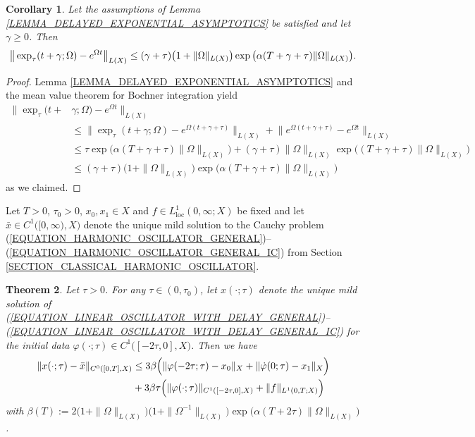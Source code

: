 \documentclass[12pt]{article}
\newtheorem{theorem}{Theorem}[section]
\newtheorem{corollary}[theorem]{Corollary}
\numberwithin{equation}{section}
\numberwithin{equation}{section}
\begin{document}
	\begin{corollary}
		\label{COROLLARY_DELAYED_EXPONENTIAL_ASYMPTOTICS}
		Let the assumptions of Lemma \ref{LEMMA_DELAYED_EXPONENTIAL_ASYMPTOTICS} be satisfied and let $\gamma \geq 0$. Then
		\begin{equation}
			\big\|\exp_{\tau}(t + \gamma; \Omega) - e^{\Omega t}\big\|_{L(X)}
			\leq (\gamma + \tau) \big(1 + \|\Omega\|_{L(X)}\big) \exp\big(\alpha (T + \gamma + \tau) \|\Omega\|_{L(X)}\big). \notag
		\end{equation}
	\end{corollary}

	\begin{proof}
		Lemma \ref{LEMMA_DELAYED_EXPONENTIAL_ASYMPTOTICS} and the mean value theorem for Bochner integration yield
		\begin{align*}
			\big\|\exp_{\tau}(t + &\gamma; \Omega) - e^{\Omega t}\big\|_{L(X)} \\
			&\leq \big\|\exp_{\tau}(t + \gamma; \Omega) - e^{\Omega (t + \gamma + \tau)}\big\|_{L(X)} +
			\big\|e^{\Omega (t + \gamma + \tau)} - e^{\Omega t}\big\|_{L(X)} \\
			&\leq \tau \exp\big(\alpha (T + \gamma + \tau) \|\Omega\|_{L(X)}\big) + 
			(\gamma + \tau) \|\Omega\|_{L(X)} \exp\big((T + \gamma + \tau) \|\Omega\|_{L(X)}\big) \\
			&\leq (\gamma + \tau) \big(1 + \|\Omega\|_{L(X)}\big) \exp\big(\alpha (T + \gamma + \tau) \|\Omega\|_{L(X)}\big)
		\end{align*}
		as we claimed.
	\end{proof}

	Let $T > 0$, $\tau_{0} > 0$, $x_{0}, x_{1} \in X$ and $f \in L^{1}_{\mathrm{loc}}(0, \infty; X)$ be fixed and
	let $\bar{x} \in C^{1}\big([0, \infty), X\big)$ denote the unique mild solution to the Cauchy problem 
	(\ref{EQUATION_HARMONIC_OSCILLATOR_GENERAL})--(\ref{EQUATION_HARMONIC_OSCILLATOR_GENERAL_IC})
	from Section \ref{SECTION_CLASSICAL_HARMONIC_OSCILLATOR}.
	\begin{theorem}
		\label{THEOREM_DELAYED_EQUATION_ASYMPTOTICS}
		Let $\tau > 0$.	For any $\tau \in (0, \tau_{0})$, let $x(\cdot; \tau)$ denote the unique mild solution of
		(\ref{EQUATION_LINEAR_OSCILLATOR_WITH_DELAY_GENERAL})--(\ref{EQUATION_LINEAR_OSCILLATOR_WITH_DELAY_GENERAL_IC})
		for the initial data $\varphi(\cdot; \tau) \in C^{1}\big([-2\tau, 0], X\big)$.
		Then we have
		\begin{equation}
			\begin{split}
				\|x(\cdot; \tau) - \bar{x}\|_{C^{0}([0, T], X)} &\leq 3 \beta \Big(
				\|\varphi(-2\tau; \tau) - x_{0}\|_{X} + \|\dot{\varphi}(0; \tau) - x_{1}\|_{X}\Big) \\
				&+ 3 \beta \tau \Big(\|\varphi(\cdot; \tau)\|_{C^{1}([-2\tau, 0], X)} + \|f\|_{L^{1}(0, T; X)}\Big)
			\end{split}
			\notag
		\end{equation}
		with $\beta(T) := 2 \big(1 + \|\Omega\|_{L(X)}\big) \big(1 + \|\Omega^{-1}\|_{L(X)}\big) \exp\big(\alpha (T + 2\tau) \|\Omega\|_{L(X)}\big)$.
	\end{theorem}
\end{document}
